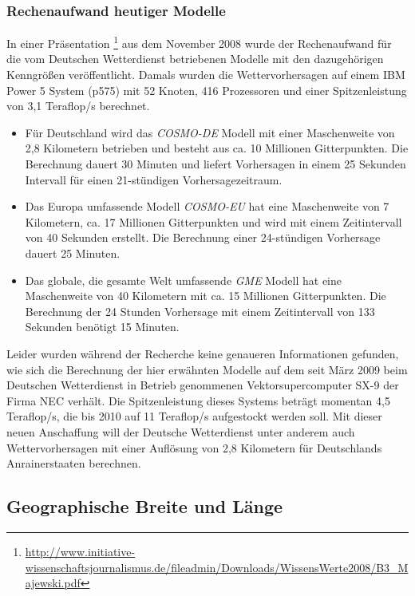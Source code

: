 \subsubsection{Rechenaufwand heutiger Modelle}

In einer Präsentation
\footnote{\url{http://www.initiative-wissenschaftsjournalismus.de/fileadmin/Downloads/WissensWerte2008/B3_Majewski.pdf}}
aus dem November 2008 wurde der Rechenaufwand für die vom Deutschen
Wetterdienst betriebenen Modelle mit den dazugehörigen Kenngrößen
veröffentlicht. Damals wurden die Wettervorhersagen auf einem IBM
Power 5 System (p575) mit 52 Knoten, 416 Prozessoren und einer
Spitzenleistung von 3,1 Teraflop/s berechnet.

\begin{itemize}
\item Für Deutschland wird das \textit{COSMO-DE} Modell mit einer
  Maschenweite von 2,8 Kilometern betrieben und besteht aus ca. 10
  Millionen Gitterpunkten. Die Berechnung dauert 30 Minuten und
  liefert Vorhersagen in einem 25 Sekunden Intervall für einen
  21-stündigen Vorhersagezeitraum.
\item Das Europa umfassende Modell \textit{COSMO-EU} hat eine
  Maschenweite von 7 Kilometern, ca. 17 Millionen Gitterpunkten und
  wird mit einem Zeitintervall von 40 Sekunden erstellt. Die
  Berechnung einer 24-stündigen Vorhersage dauert 25 Minuten.
\item Das globale, die gesamte Welt umfassende \textit{GME} Modell hat
  eine Maschenweite von 40 Kilometern mit ca. 15 Millionen
  Gitterpunkten. Die Berechnung der 24 Stunden Vorhersage mit einem
  Zeitintervall von 133 Sekunden benötigt 15 Minuten.
\end{itemize}

Leider wurden während der Recherche keine genaueren Informationen
gefunden, wie sich die Berechnung der hier erwähnten Modelle auf dem
seit März 2009 beim Deutschen Wetterdienst in Betrieb genommenen
Vektorsupercomputer SX-9 der Firma NEC verhält. Die Spitzenleistung
dieses Systems beträgt momentan 4,5 Teraflop/s, die bis 2010 auf 11
Teraflop/s aufgestockt werden soll. Mit dieser neuen Anschaffung will
der Deutsche Wetterdienst unter anderem auch Wettervorhersagen mit
einer Auflösung von 2,8 Kilometern für Deutschlands Anrainerstaaten
berechnen.

\subsection{Geographische Breite und Länge}

